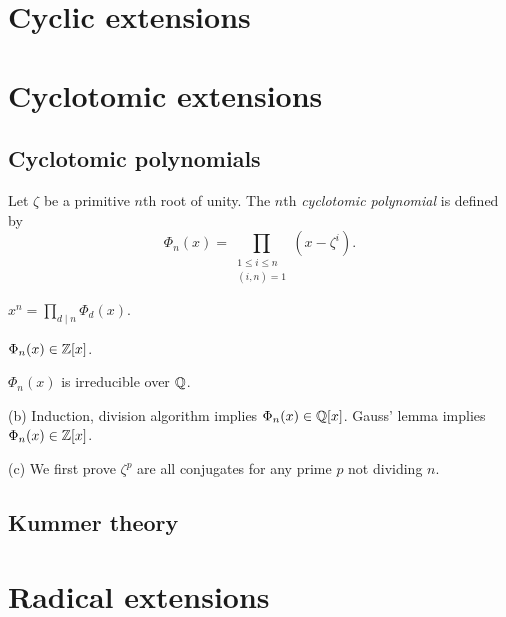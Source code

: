 \documentclass{../note}
\begin{document}
\chapter{Cyclic extensions}





\chapter{Cyclotomic extensions}
\section{Cyclotomic polynomials}

\begin{prb}
Let $\zeta$ be a primitive $n$th root of unity.
The $n$th \emph{cyclotomic polynomial} is defined by
\[\Phi_n(x)=\prod_{\substack{1\le i\le n\\(i,n)=1}}(x-\zeta^i).\]
\begin{parts}
\item $x^n=\prod_{d\mid n}\Phi_d(x)$.
\item $\Phi_n(x)\in\mathbb{Z}[x]$.
\item $\Phi_n(x)$ is irreducible over $\mathbb{Q}$.
\end{parts}
\end{prb}
\begin{pf}

(b)
Induction, division algorithm implies $\Phi_n(x)\in\mathbb{Q}[x]$.
Gauss' lemma implies $\Phi_n(x)\in\mathbb{Z}[x]$.

(c)
We first prove $\zeta^p$ are all conjugates for any prime $p$ not dividing $n$.
\end{pf}



\begin{prb}

\end{prb}



\section{Kummer theory}








\chapter{Radical extensions}
\end{document}

